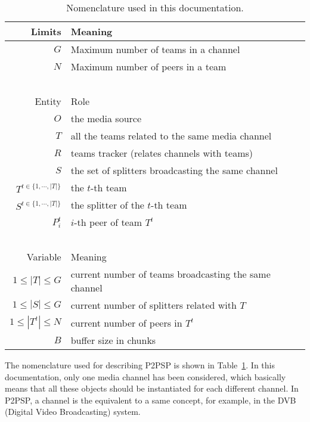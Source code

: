 \begin{table}
  \begin{tabular}{rl}
    Limits   & Meaning \\
    \hline
    $G$     & Maximum number of teams in a channel \\
    $N$     & Maximum number of peers in a team \\
    ~\\
    Entity  & Role \\
    \hline
    $O$     & the media source \\
    $T$     & all the teams related to the same media channel \\
    $R$     & teams tracker (relates channels with teams)\\
    $S$     & the set of splitters broadcasting the same channel \\
    $T^{t\in\{1,\cdots,|T|\}}$ & the $t$-th team \\
    $S^{t\in\{1,\cdots,|T|\}}$ & the splitter of the $t$-th team \\
    $P^t_i$ & $i$-th peer of team $T^t$ \\
    ~\\
    Variable & Meaning \\
    \hline
    $1\leq |T|\leq G$   & current number of teams broadcasting the same channel \\
    $1\leq |S|\leq G$ & current number of splitters related with $T$ \\
    $1\leq |T^t|\leq N$ & current number of peers in $T^t$ \\
    $B$     & buffer size in chunks \\
  \end{tabular}
  \caption{Nomenclature used in this
    documentation.\label{tab:nomenclature}}
\end{table}

The nomenclature used for describing P2PSP is shown in
Table~\ref{tab:nomenclature}. In this documentation, only one media
channel has been considered, which basically means that all these
objects should be instantiated for each different channel. In P2PSP, a
channel is the equivalent to a same concept, for example, in the DVB
(Digital Video Broadcasting) system.
